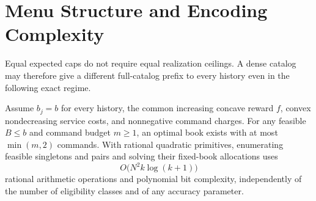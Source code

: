 \section{Menu Structure and Encoding Complexity}\label{sec:caps54}
Equal expected caps do not require equal realization ceilings. A dense catalog may therefore give a different full-catalog prefix to every history even in the following exact regime.
\begin{theorem}\label{thm:twocommand54}
Assume $b_j=b$ for every history, the common increasing concave reward $f$, convex nondecreasing service costs, and nonnegative command charges. For any feasible $B\leq b$ and command budget $m\geq1$, an optimal book exists with at most $\min(m,2)$ commands. With rational quadratic primitives, enumerating feasible singletons and pairs and solving their fixed-book allocations uses
\[
 O\bigl(N^2k\log(k+1)\bigr)
\]
rational arithmetic operations and polynomial bit complexity, independently of the number of eligibility classes and of any accuracy parameter.
\end{theorem}
